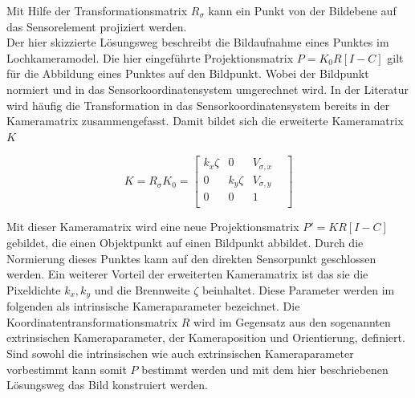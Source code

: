 Mit Hilfe der Transformationsmatrix $R_\sigma$ kann ein Punkt von der Bildebene auf das Sensorelement projiziert werden.\\

Der hier skizzierte Lösungsweg beschreibt die Bildaufnahme eines Punktes im Lochkameramodel. Die hier eingeführte Projektionsmatrix $P=K_0R[I -C]$ gilt für die Abbildung eines Punktes auf den Bildpunkt. Wobei der Bildpunkt normiert und in das Sensorkoordinatensystem umgerechnet wird. In der Literatur wird häufig die Transformation in das Sensorkoordinatensystem bereits in der Kameramatrix zusammengefasst. Damit bildet sich die erweiterte Kameramatrix $K$

\begin{equation}
 K=	R_\sigma K_0=  \begin{bmatrix}
 	k_x \zeta & 0 & V_{\sigma,x}\\
 	0 & k_y \zeta & V_{\sigma,y}\\
 	0 & 0   & 1 &\\
 \end{bmatrix}
\end{equation}

Mit dieser Kameramatrix wird eine neue Projektionsmatrix $P'=KR[I -C]$ gebildet, die einen Objektpunkt auf einen Bildpunkt abbildet. Durch die Normierung dieses Punktes kann auf den direkten Sensorpunkt geschlossen werden. 
Ein weiterer Vorteil der erweiterten Kameramatrix ist das sie die Pixeldichte $k_x,k_y$ und die Brennweite $\zeta$ beinhaltet. Diese Parameter werden im folgenden als intrinsische Kameraparameter bezeichnet. Die Koordinatentransformationsmatrix $R$ wird im Gegensatz aus den sogenannten extrinsischen Kameraparameter, der Kameraposition und Orientierung, definiert. Sind sowohl die intrinsischen wie auch extrinsischen Kameraparameter vorbestimmt kann somit $P$ bestimmt werden und mit dem hier beschriebenen Lösungsweg das Bild konstruiert werden. %




